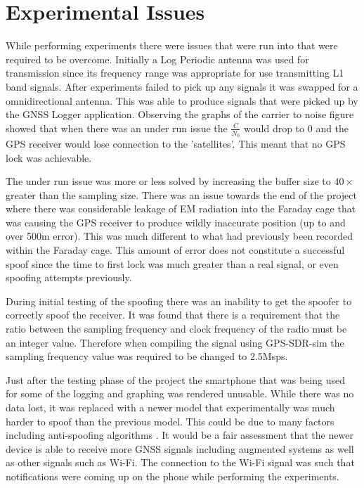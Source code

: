 \section{Experimental Issues}
While performing experiments there were issues that were run into that were required to be overcome. Initially a Log Periodic antenna was used for transmission since its
frequency range was appropriate for use transmitting L1 band signals. After experiments failed to pick up any signals it was swapped for a omnidirectional antenna. This
was able to produce signals that were picked up by the GNSS Logger application. Observing the graphs of the carrier to noise figure showed that when there was an under run
issue the $\frac{C}{N_0}$ would drop to 0 and the GPS receiver would lose connection to the 'satellites'. This meant that no GPS lock was achievable.

The under run issue was more or less solved by increasing the buffer size to $40\times$ greater than the sampling size.
There was an issue towards the end of the project where there was considerable leakage of EM radiation into the Faraday cage that was causing the GPS receiver to produce
wildly inaccurate position (up to and over 500m error). This was much different to what had previously been recorded within the Faraday cage. This amount of error does
not constitute a successful spoof since the time to first lock was much greater than a real signal, or even spoofing attempts previously. 

During initial testing of the spoofing there was an inability to get the spoofer to correctly spoof the receiver. It was found that there is a requirement that the ratio
between the sampling frequency and clock frequency of the radio must be an integer value. Therefore when compiling the signal using GPS-SDR-sim the sampling frequency
value was required to be changed to 2.5Msps.  

Just after the testing phase of the project the smartphone that was being used for some of the logging and graphing was rendered unusable. While there was no data lost,
it was replaced with a newer model that experimentally was much harder to spoof than the previous model. This could be due to many factors including anti-spoofing
algorithms \cite{RN39}. It would be a fair assessment that the newer device is able to receive more GNSS signals including augmented systems as well as other signals such as Wi-Fi.
The connection to the Wi-Fi signal was such that notifications were coming up on the phone while performing the experiments.

